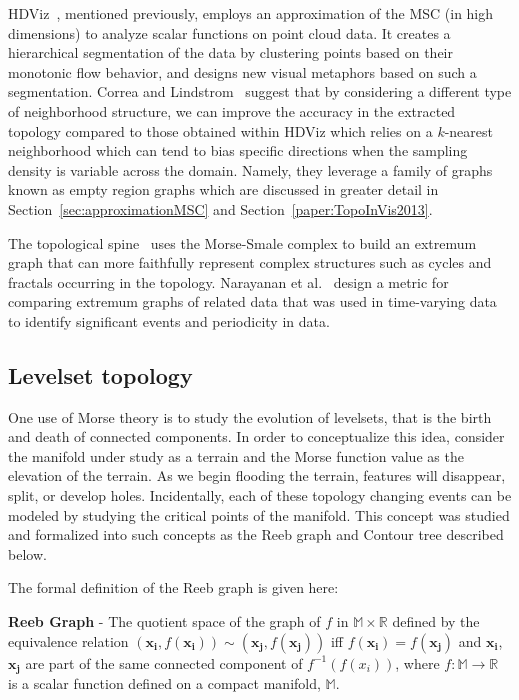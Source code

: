 HDViz~\cite{GerberBremerPascucci2010}, mentioned previously, employs an approximation of the MSC (in high dimensions) to analyze scalar functions on point cloud data.
%
It creates a hierarchical segmentation of the data by clustering points based on their monotonic flow behavior, and designs new visual metaphors based on such a segmentation.
%
Correa and Lindstrom~\cite{CorreaLindstrom2011} suggest that by considering a different type of neighborhood structure, we can improve the accuracy in the extracted topology compared to those obtained within HDViz which relies on a $k$-nearest neighborhood which can tend to bias specific directions when the sampling density is variable across the domain.
%
Namely, they leverage a family of graphs known as empty region graphs which are discussed in greater detail in Section~\ref{sec:approximationMSC} and Section~\ref{paper:TopoInVis2013}.
%

The topological spine~\cite{CorreaLindstromBremer2011} uses the Morse-Smale complex to build an extremum graph that can more faithfully represent complex structures such as cycles and fractals occurring in the topology.
%
Narayanan et al.~\cite{NarayananThomasNatarajan2015} design a metric for comparing extremum graphs of related data that was used in time-varying data to identify significant events and periodicity in data.

\subsection{Levelset topology}

One use of Morse theory is to study the evolution of levelsets, that is the birth and death of connected components.
%
In order to conceptualize this idea, consider the manifold under study as a terrain and the Morse function value as the elevation of the terrain.
%
As we begin flooding the terrain, features will disappear, split, or develop holes.
%
Incidentally, each of these topology changing events can be modeled by studying the critical points of the manifold.
%
This concept was studied and formalized into such concepts as the Reeb graph and Contour tree described below.

The formal definition of the Reeb graph is given here:

\begin{defn}
\textbf{Reeb Graph} - The quotient space of the graph of $f$ in
$\mathbb{M} \times \mathbb{R}$ defined by the equivalence relation
$(\mathbf{x_i},f(\mathbf{x_i})) \sim (\mathbf{x_j},f(\mathbf{x_j}))$ iff
$f(\mathbf{x_i}) = f(\mathbf{x_j})$ and $\mathbf{x_i}$,$\mathbf{x_j}$ are part
of the same connected component of $f^{-1}(f(x_i))$, where $f : \mathbb{M} \rightarrow \mathbb{R}$ is a scalar function defined on a compact manifold, $\mathbb{M}$.
\end{defn}

